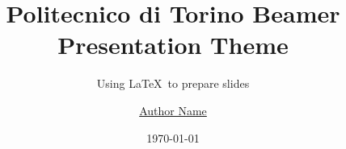 \documentclass{beamer}
\title{Politecnico di Torino Beamer Presentation Theme}
\subtitle{Using \LaTeX\ to prepare slides}
\author{\href{mailto:author@studenti.polito.it}{Author Name}}
\date{\today}
\begin{document}
\maketitle









\title{} %
\backmatter
\end{document}
